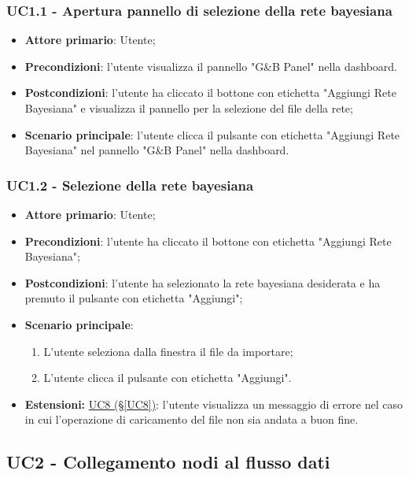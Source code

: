 \subsubsection{UC1.1 - Apertura pannello di selezione della rete bayesiana}\label{UC1.1}
\begin{itemize}
	\item \textbf{Attore primario}: Utente; 
	\item \textbf{Precondizioni}: l'utente visualizza il pannello "G\&B Panel" nella dashboard.
	\item \textbf{Postcondizioni}: l'utente ha cliccato il bottone con etichetta "Aggiungi Rete Bayesiana" e visualizza il pannello per la selezione del file della rete;
	\item \textbf{Scenario principale}: l'utente clicca il pulsante con etichetta "Aggiungi Rete Bayesiana" nel pannello "G\&B Panel" nella dashboard.
\end{itemize}


\subsubsection{UC1.2 - Selezione della rete bayesiana}\label{UC1.2}
\begin{itemize}
	\item \textbf{Attore primario}: Utente;
	\item \textbf{Precondizioni}: l'utente ha cliccato il bottone con etichetta "Aggiungi Rete Bayesiana";
	\item \textbf{Postcondizioni}: l'utente ha selezionato la rete bayesiana desiderata e ha premuto il pulsante con etichetta "Aggiungi";
	\item \textbf{Scenario principale}:
	\begin{enumerate}
		\item L'utente seleziona dalla finestra il file da importare;
		\item L'utente clicca il pulsante con etichetta "Aggiungi".
	\end{enumerate}
	\item \textbf{Estensioni:} \hyperref[UC8]{UC8 (§\ref*{UC8})}: l'utente visualizza un messaggio di errore nel caso in cui l'operazione di caricamento del file non sia andata a buon fine.
\end{itemize}

\pagebreak

\subsection{UC2 - Collegamento nodi al flusso dati}\label{UC2}

